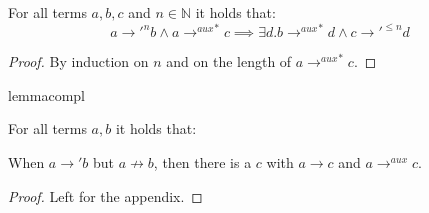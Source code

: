 \begin{corollary}
\label{cor:cdpauxcor}

For all terms $a,b,c$ and $n \in \mathbb{N}$ it holds that:
\[
a {\longrightarrow'}^n b \land a {\longrightarrow^{aux}}^* c \implies \exists d . b {\longrightarrow^{aux}}^* d \land c {\longrightarrow'}^{\leq n} d
\]

\begin{proof}

By induction on $n$ and on the length of $a {\longrightarrow^{aux}}^* c$.

\end{proof}

\end{corollary}

\begin{restatable}[Complementarity]{lemma}{compl}
\label{lem:compl}

For all terms $a,b$ it holds that:

When $a \longrightarrow' b$ but $a \not\longrightarrow b$, then there is a $c$ with $a \longrightarrow c$ and $a \longrightarrow^{aux} c$.

\end{restatable}

\begin{proof}
Left for the appendix.
\end{proof}

